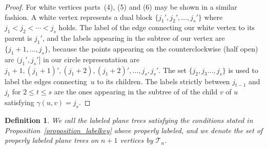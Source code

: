 \documentclass[11pt]{amsart}
\newtheorem{definition}[theorem]{Definition}
\numberwithin{equation}{section}
\newcommand{\ptree}{{\mathcal T}}
\begin{document}
\begin{proof}
For white vertices parts~(4), (5) and (6) may be shown in a similar
fashion. A white vertex represents a dual block
$\{j_{1}',j_{2}',\ldots,j_{s}'\}$ 
where $j_{1}<j_{2}<\cdots<j_{s}$ holds. The label of
the edge connecting our white vertex to its parent is $j_{1}'$, and the
labels appearing in the subtree of our vertex are
$\{j_{1}+1,\ldots,j_{s}\}$, because the points appearing on the
counterclockwise (half open) arc $(j_{1}',j_{s}']$ in our circle representation are
$j_{1}+1,(j_{1}+1)',(j_{1}+2),(j_{1}+2)',\ldots,j_{s},j_{s}'$. The set
$\{j_{2},j_{3}\ldots,j_{s}\}$ is used to label the edges connecting~$u$ to its
children. The labels 
strictly between $j_{t-1}$ and $j_{t}$ for $2\leq t\leq s$ are the ones
appearing in the subtree of of the child $v$ of $u$ satisfying
$\gamma(u,v)=j_{s}$.    
\end{proof}  
\begin{definition}
  We call the labeled plane trees satisfying the conditions stated in
  Proposition~\ref{proposition_labelkey}  above {\em properly labeled},
  and we denote the set of properly labeled plane trees on $n+1$
  vertices by $\ptree_{n}$.  
\end{definition}  
\end{document}
